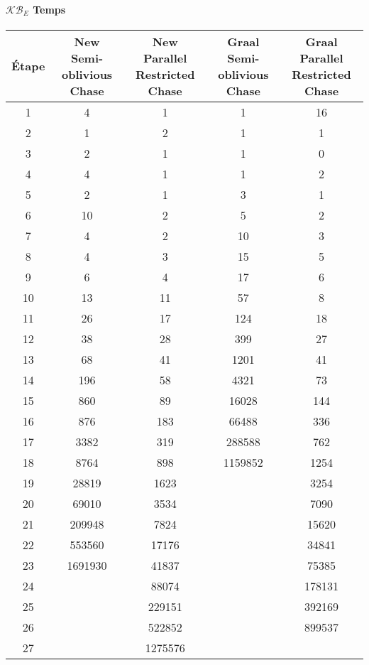 \paragraph{$\mathcal{KB}_E$ Temps}
\begin{center}
\begin{tabular}{|c||c|c|c|c|}
    \hline
    Étape & \shortstack{New \\ Semi-oblivious Chase} & \shortstack{New \\ Parallel Restricted Chase} & \shortstack{Graal \\ Semi-oblivious Chase} & \shortstack{Graal \\ Parallel Restricted Chase} \\
    \hline
     \hline
1&4&	1&					1&	16\\
     \hline
2&1&	2&					1&	1\\
     \hline
3&2&	1&					1&	0\\
     \hline
4&4&	1&					1&	2\\
     \hline
5&2&	1&					3&	1\\
     \hline
6&10&	2&					5&	2\\
     \hline
7&4&	2&					10&	3\\
     \hline
8&4&	3&					15&	5\\
     \hline
9&6&	4&					17&	6\\
     \hline
10&13&	11&					57&	8\\
     \hline
11&26&	17&					124&	18\\
     \hline
12&38&	28&					399&	27\\
     \hline
13&68&	41&					1201&	41\\
     \hline
14&196&	58&					4321&	73\\
     \hline
15&860&	89&					16028&	144\\
     \hline
16&876&	183&					66488&	336\\
     \hline
17&3382&	319&					288588&	762\\
     \hline
18&8764&	898	&				1159852&	1254\\
     \hline
19&28819&	1623&		&				3254\\
     \hline
20&69010&	3534&		&				7090\\
     \hline
21&209948&	7824&		&				15620\\
     \hline
22&553560&	17176&		&				34841\\
     \hline
23&1691930&	41837&		&				75385\\
     \hline
24&&	88074&			&			178131\\
     \hline
25&&	229151&			&			392169\\
     \hline
26&&	522852&			&			899537\\
     \hline
27&&	1275576&		&				\\
     \hline
\end{tabular}
\end{center}